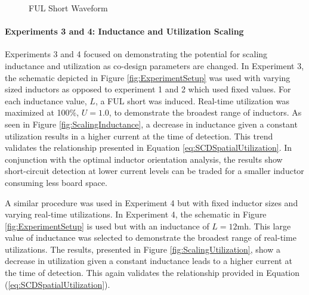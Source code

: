 \begin{figure}
    \centering
    \caption{FUL Short Waveform}
    \label{fig:FULShort}
\end{figure}

\paragraph{Experiments 3 and 4: Inductance and Utilization Scaling}
Experiments 3 and 4 focused on demonstrating the potential for scaling inductance and utilization as co-design parameters are changed.
In Experiment 3, the schematic depicted in Figure \ref{fig:ExperimentSetup} was used with varying sized inductors as opposed to experiment 1 and 2 which used fixed values. For each inductance value, $L$, a FUL short was induced. Real-time utilization was maximized at 100\%, $U = 1.0$, to demonstrate the broadest range of inductors. As seen in Figure \ref{fig:ScalingInductance}, a decrease in inductance given a constant utilization results in a higher current at the time of detection. This trend validates the relationship presented in Equation \ref{eq:SCDSpatialUtilization}. In conjunction with the optimal inductor orientation analysis, the results show short-circuit detection at lower current levels can be traded for a smaller inductor consuming less board space.

A similar procedure was used in Experiment 4 but with fixed inductor sizes and varying real-time utilizations. In Experiment 4, the schematic in Figure \ref{fig:ExperimentSetup} is used but with an inductance of $L = 12 \text{mh}$.  This large value of inductance was selected to demonstrate the broadest range of real-time utilizations. The results, presented in Figure \ref{fig:ScalingUtilization}, show a decrease in utilization given a constant inductance leads to a higher current at the time of detection. This again validates the relationship provided in Equation (\ref{eq:SCDSpatialUtilization}).

